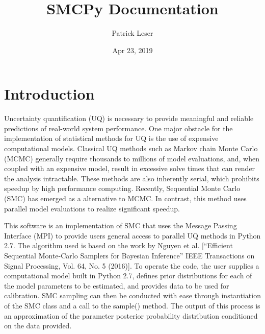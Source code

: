 \documentclass[letterpaper,10pt,english]{sphinxmanual}
\title{SMCPy Documentation}
\date{Apr 23, 2019}
\author{Patrick Leser}
\begin{document}
\pagestyle{empty}
\sphinxmaketitle
\pagestyle{plain}
\sphinxtableofcontents
\pagestyle{normal}
\label{\detokenize{index::doc}}



\chapter{Introduction}
\label{\detokenize{introduction:introduction}}\label{\detokenize{introduction:introduction-section}}\label{\detokenize{introduction::doc}}
Uncertainty quantification (UQ) is necessary to provide meaningful and reliable predictions of real-world system performance. One major obstacle for the implementation of statistical methods for UQ is the use of expensive computational models. Classical UQ methods such as Markov chain Monte Carlo (MCMC) generally require thousands to millions of model evaluations, and, when coupled with an expensive model, result in excessive solve times that can render the analysis intractable. These methods are also inherently serial, which prohibits speedup by high performance computing. Recently, Sequential Monte Carlo (SMC) has emerged as a alternative to MCMC. In contrast, this method uses parallel model evaluations to realize significant speedup.

This software is an implementation of SMC that uses the Message Passing Interface (MPI) to provide users general access to parallel UQ methods in Python 2.7. The algorithm used is based on the work by Nguyen et al. {[}“Efficient Sequential Monte-Carlo Samplers for Bayesian Inference” IEEE Transactions on Signal Processing, Vol. 64, No. 5 (2016){]}. To operate the code, the user supplies a computational model built in Python 2.7, defines prior distributions for each of the model parameters to be estimated, and provides data to be used for calibration. SMC sampling can then be conducted with ease through instantiation of the SMC class and a call to the sample() method. The output of this process is an approximation of the parameter posterior probability distribution conditioned on the data provided.
\end{document}

